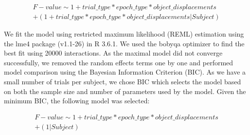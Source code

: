 \begin{gather}\label{eq:lmm_formula}
     F-value \sim 1 + trial\_type * epoch\_type * object\_displacements \\
     + (1 + trial\_type * epoch\_type * object\_displacements | Subject ) 
\end{gather} 

We fit the model using restricted maximum likelihood (REML) estimation \citep{Corbeil1976-qq} using the lme4 package (v1.1-26) in R 3.6.1. We used the bobyqa optimizer to find the best fit using 20000 interactions. As the maximal model did not converge successfully, we removed the random effects terms one by one and performed model comparison using the Bayesian Information Criterion (BIC). As we have a small number of trials per subject, we chose BIC which selects the model based on both the sample size and number of parameters used by the model. Given the minimum BIC, the following model was selected:

\begin{gather}\label{eq:lmm_formula_used}
     F-value \sim 1 + trial\_type * epoch\_type * object\_displacements \\
             + (1 | Subject)
\end{gather} 

